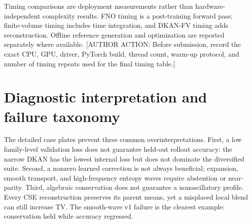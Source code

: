 \documentclass[10pt,twocolumn]{article}
\newcommand{\todoauthor}[1]{\textcolor{red!70!black}{[AUTHOR ACTION: #1]}}
\begin{document}
Timing comparisons are deployment measurements rather than hardware-independent complexity results. FNO timing is a post-training forward pass; finite-volume timing includes time integration, and DKAN-FV timing adds reconstruction. Offline reference generation and optimization are reported separately where available. \todoauthor{Before submission, record the exact CPU, GPU, driver, PyTorch build, thread count, warm-up protocol, and number of timing repeats used for the final timing table.}

\section{Diagnostic interpretation and failure taxonomy}

The detailed case plates prevent three common overinterpretations. First, a low family-level validation loss does not guarantee held-out rollout accuracy: the narrow DKAN has the lowest internal loss but does not dominate the diversified suite. Second, a nonzero learned correction is not always beneficial; expansion, smooth transport, and high-frequency entropy waves require abstention or near-parity. Third, algebraic conservation does not guarantee a nonoscillatory profile. Every CSE reconstruction preserves its parent means, yet a misplaced local blend can still increase TV. The smooth-wave v1 failure is the clearest example: conservation held while accuracy regressed.
\end{document}

